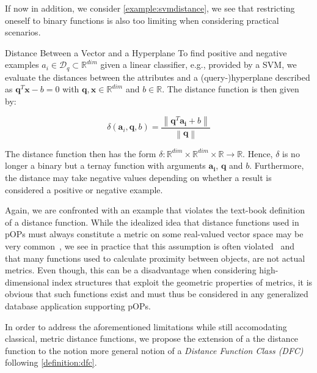If now in addition, we consider \cref{example:svmdistance}, we see that restricting oneself to binary functions is also too limiting when considering practical scenarios.

\begin{example}[label=example:svmdistance]{Distance Between a Vector and a Hyperplane}{}
    To find positive and negative examples $a_{i} \in \mathcal{D}_q \subset \mathbb{R}^{dim}$ given a linear classifier, e.g., provided by a SVM, we evaluate the distances between the attributes and a (query-)hyperplane described as $\mathbf{q}^T\mathbf{x} - b = 0$ with $\mathbf{q},\mathbf{x} \in \mathbb{R}^{dim}$ and $b \in \mathbb{R}$. The distance function is then given by:

    \begin{equation}
        \delta (\mathbf{a}_i, \mathbf{q}, b) = \frac{\left\|\mathbf{q}^T \mathbf{a_i} + b \right\|}{\left\|\mathbf{q}\right\|}
    \end{equation}
    
    The distance function then has the form $\delta \colon \mathbb{R}^{dim} \times \mathbb{R}^{dim} \times \mathbb{R} \to \mathbb{R}$. Hence, $\delta$ is no longer a binary but a ternay function with arguments $\mathbf{a_{i}}$, $\mathbf{q}$ and $b$. Furthermore, the distance may take negative values depending on whether a result is considered a positive or negative example.
\end{example}


Again, we are confronted with an example that violates the text-book definition of a distance function. While the idealized idea that distance functions used in pOPs must always constitute a metric on some real-valued vector space may be very common~\cite{Zezula:2006similarity}, we see in practice that this assumption is often violated~\cite{Bernhauer:2019Nonmetric}  and that many functions used to calculate proximity between objects, are not actual metrics. Even though, this can be a disadvantage when considering high-dimensional index structures that exploit the geometric properties of metrics, it is obvious that such functions exist and must thus be considered in any generalized database application supporting pOPs.

In order to address the aforementioned limitations while still accomodating classical, metric distance functions, we propose the extension of a the distance function to the notion more general notion of a \emph{Distance Function Class (DFC)} following \cref{definition:dfc}.

